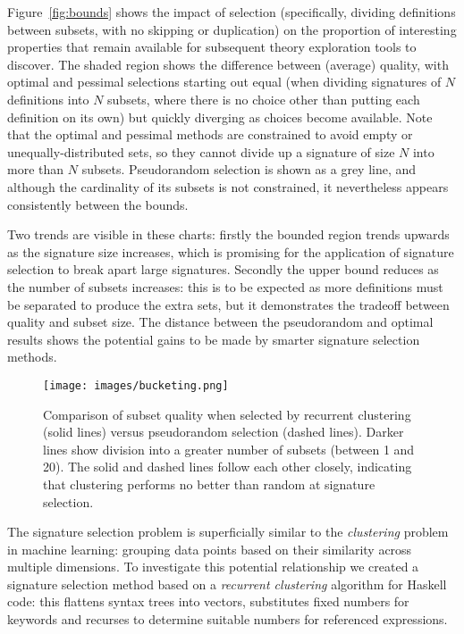 Figure~\ref{fig:bounds} shows the impact of selection (specifically, dividing
definitions between subsets, with no skipping or duplication) on the proportion
of interesting properties that remain available for subsequent theory
exploration tools to discover. The shaded region shows the difference between
(average) quality, with optimal and pessimal selections starting out equal (when
dividing signatures of $N$ definitions into $N$ subsets, where there is no
choice other than putting each definition on its own) but quickly diverging as
choices become available. Note that the optimal and pessimal methods are
constrained to avoid empty or unequally-distributed sets, so they cannot divide
up a signature of size $N$ into more than $N$ subsets. Pseudorandom selection is
shown as a grey line, and although the cardinality of its subsets is not
constrained, it nevertheless appears consistently between the bounds.

Two trends are visible in these charts: firstly the bounded region trends
upwards as the signature size increases, which is promising for the application
of signature selection to break apart large signatures. Secondly the upper bound
reduces as the number of subsets increases: this is to be expected as more
definitions must be separated to produce the extra sets, but it demonstrates the
tradeoff between quality and subset size. The distance between the pseudorandom
and optimal results shows the potential gains to be made by smarter signature
selection methods.

\begin{figure}
  \texttt{[image: images/bucketing.png]}
  \caption{Comparison of subset quality when selected by recurrent clustering
    (solid lines) versus pseudorandom selection (dashed lines). Darker lines
    show division into a greater number of subsets (between 1 and 20). The solid
    and dashed lines follow each other closely, indicating that clustering
    performs no better than random at signature selection.}
  \label{fig:bucketing}
\end{figure}

The signature selection problem is superficially similar to the
\emph{clustering} problem in machine learning: grouping data points based on
their similarity across multiple dimensions. To investigate this potential
relationship we created a signature selection method based on a \emph{recurrent
  clustering} algorithm for Haskell code: this flattens syntax trees into
vectors, substitutes fixed numbers for keywords and recurses to determine
suitable numbers for referenced expressions.

